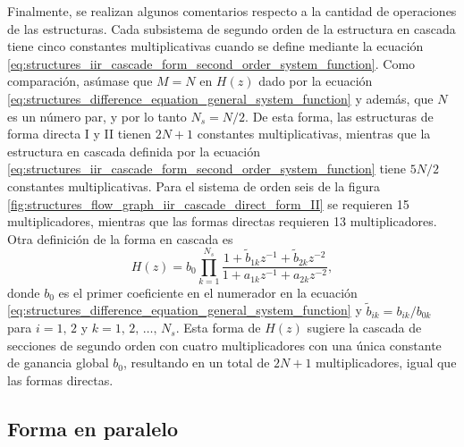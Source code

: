 \documentclass[a4paper]{report}
\begin{document}
Finalmente, se realizan algunos comentarios respecto a la cantidad de operaciones de las estructuras. Cada subsistema de segundo orden de la estructura en cascada tiene cinco constantes multiplicativas cuando se define mediante la ecuación \ref{eq:structures_iir_cascade_form_second_order_system_function}. Como comparación, asúmase que \(M=N\) en \(H(z)\) dado por la ecuación \ref{eq:structures_difference_equation_general_system_function} y además, que \(N\) es un número par, y por lo tanto \(N_s=N/2\). De esta forma, las estructuras de forma directa I y II tienen \(2N+1\) constantes multiplicativas, mientras que la estructura en cascada definida por la ecuación \ref{eq:structures_iir_cascade_form_second_order_system_function} tiene \(5N/2\) constantes multiplicativas. Para el sistema de orden seis de la figura \ref{fig:structures_flow_graph_iir_cascade_direct_form_II} se requieren 15 multiplicadores, mientras que las formas directas requieren 13 multiplicadores. Otra definición de la forma en cascada es
\[
 H(z)=b_0\prod_{k=1}^{N_s}\frac{1+\tilde{b}_{1k}z^{-1}+\tilde{b}_{2k}z^{-2}}{1+a_{1k}z^{-1}+a_{2k}z^{-2}}, 
\]
donde \(b_0\) es el primer coeficiente en el numerador en la ecuación \ref{eq:structures_difference_equation_general_system_function} y \(\tilde{b}_{ik}=b_{ik}/b_{0k}\) para \(i=1,\,2\) y \(k=1,\,2,\,\dots,\,N_s\). Esta forma de \(H(z)\) sugiere la cascada de secciones de segundo orden con cuatro multiplicadores con una única constante de ganancia global \(b_0\), resultando en un total de \(2N+1\) multiplicadores, igual que las formas directas.

\subsection{Forma en paralelo}
\end{document}
